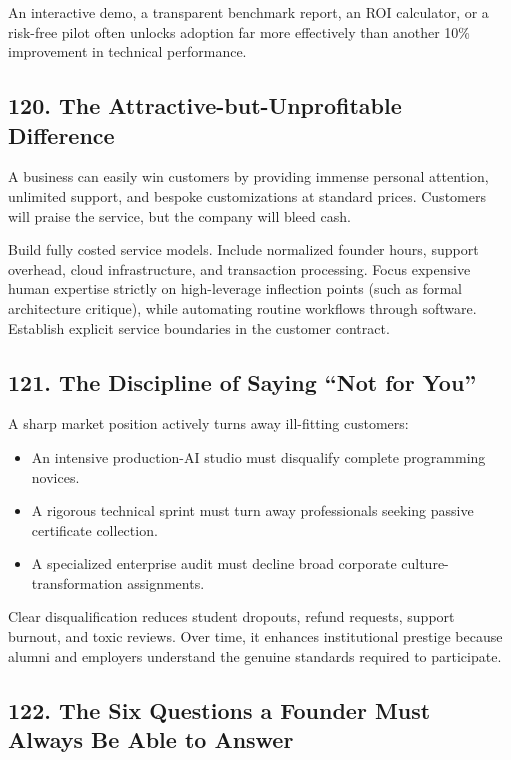 An interactive demo, a transparent benchmark report, an ROI calculator, or a risk-free pilot often unlocks adoption far more effectively than another 10\% improvement in technical performance.

\subsection*{120. The Attractive-but-Unprofitable Difference}

A business can easily win customers by providing immense personal attention, unlimited support, and bespoke customizations at standard prices. Customers will praise the service, but the company will bleed cash.

Build fully costed service models. Include normalized founder hours, support overhead, cloud infrastructure, and transaction processing. Focus expensive human expertise strictly on high-leverage inflection points (such as formal architecture critique), while automating routine workflows through software. Establish explicit service boundaries in the customer contract.

\subsection*{121. The Discipline of Saying ``Not for You''}

A sharp market position actively turns away ill-fitting customers:
\begin{itemize}
    \item An intensive production-AI studio must disqualify complete programming novices.
    \item A rigorous technical sprint must turn away professionals seeking passive certificate collection.
    \item A specialized enterprise audit must decline broad corporate culture-transformation assignments.
\end{itemize}

Clear disqualification reduces student dropouts, refund requests, support burnout, and toxic reviews. Over time, it enhances institutional prestige because alumni and employers understand the genuine standards required to participate.

\subsection*{122. The Six Questions a Founder Must Always Be Able to Answer}

